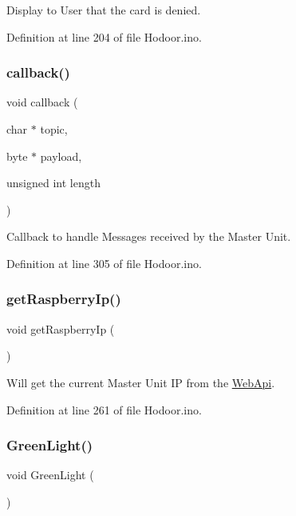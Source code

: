 Display to User that the card is denied. 



Definition at line 204 of file Hodoor.\+ino.

\mbox{\label{_hodoor_8ino_ac3a129f66dc859e2b7279565f4e1de78}} 
\subsubsection{\texorpdfstring{callback()}{callback()}}
{\footnotesize\ttfamily void callback (\begin{DoxyParamCaption}\item[{char $\ast$}]{topic,  }\item[{byte $\ast$}]{payload,  }\item[{unsigned int}]{length }\end{DoxyParamCaption})}

Callback to handle Messages received by the Master Unit. 

Definition at line 305 of file Hodoor.\+ino.

\mbox{\label{_hodoor_8ino_a7a69432900bad935bd00eb0a9d4bf61f}} 
\subsubsection{\texorpdfstring{get\+Raspberry\+Ip()}{getRaspberryIp()}}
{\footnotesize\ttfamily void get\+Raspberry\+Ip (\begin{DoxyParamCaption}{ }\end{DoxyParamCaption})}

Will get the current Master Unit IP from the \mbox{\hyperlink{namespace_web_api}{Web\+Api}}. 

Definition at line 261 of file Hodoor.\+ino.

\mbox{\label{_hodoor_8ino_a053826d2d5448727c8fa26fc929e0747}} 
\subsubsection{\texorpdfstring{Green\+Light()}{GreenLight()}}
{\footnotesize\ttfamily void Green\+Light (\begin{DoxyParamCaption}{ }\end{DoxyParamCaption})}



